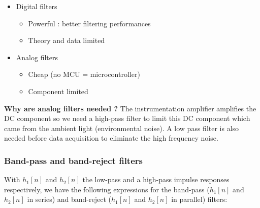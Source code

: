 \vspace{0.2cm}
\begin{minipage}{0.45\linewidth}

\begin{itemize}
    \item Digital filters
    \begin{itemize}
        \item Powerful : better filtering performances
        \item Theory and data limited
    \end{itemize}
\end{itemize}

\end{minipage}\hfill
\begin{minipage}{0.45\linewidth}

\begin{itemize}
    \item Analog filters
    \begin{itemize}
        \item Cheap (no MCU = microcontroller)
        \item Component limited
    \end{itemize}
\end{itemize}
\end{minipage}

\vspace{0.2cm}
\textbf{Why are analog filters needed ? }
The instrumentation amplifier amplifies the DC component so we need a high-pass filter to limit this DC component which came from the ambient light (environmental noise). A low pass filter is also needed before data acquisition to eliminate the high frequency noise.

\subsubsection{Band-pass and band-reject filters}

With $h_1[n]$ and $h_2[n]$ the low-pass and a high-pass impulse responses respectively, we have the following expressions for the band-pass ($h_1[n]$ and $h_2[n]$ in series) and band-reject ($h_1[n]$ and $h_2[n]$ in parallel) filters:


